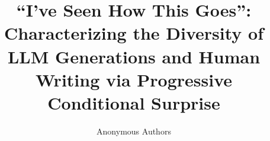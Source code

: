 \documentclass{article}
\title{``I've Seen How This Goes'': Characterizing the Diversity of LLM Generations and Human Writing via Progressive Conditional Surprise}
\author{Anonymous Authors}
\begin{document}
\maketitle

\begin{abstract}

\end{abstract}















\newpage
\appendix















\clearpage

\end{document}
